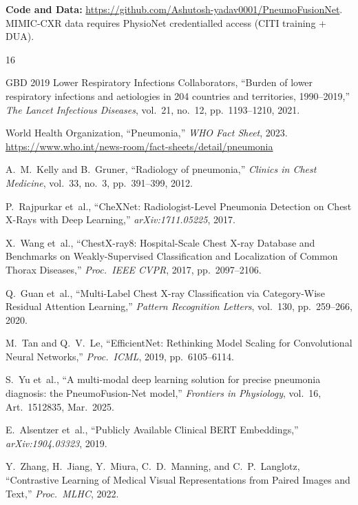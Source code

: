 \documentclass[conference]{IEEEtran}
\begin{document}
\vspace{4pt}
\noindent\textbf{Code and Data:} \url{https://github.com/Ashutosh-yadav0001/PneumoFusionNet}. MIMIC-CXR data requires PhysioNet credentialled access (CITI training + DUA).

{\small
\begin{thebibliography}{16}

GBD 2019 Lower Respiratory Infections Collaborators, ``Burden of lower respiratory infections and aetiologies in 204 countries and territories, 1990--2019,'' \emph{The Lancet Infectious Diseases}, vol.~21, no.~12, pp.~1193--1210, 2021.

World Health Organization, ``Pneumonia,'' \emph{WHO Fact Sheet}, 2023.
\url{https://www.who.int/news-room/fact-sheets/detail/pneumonia}

A.~M.~Kelly and B.~Gruner, ``Radiology of pneumonia,'' \emph{Clinics in Chest Medicine}, vol.~33, no.~3, pp.~391--399, 2012.

P.~Rajpurkar et~al., ``CheXNet: Radiologist-Level Pneumonia Detection on Chest X-Rays with Deep Learning,'' \emph{arXiv:1711.05225}, 2017.

X.~Wang et~al., ``ChestX-ray8: Hospital-Scale Chest X-ray Database and Benchmarks on Weakly-Supervised Classification and Localization of Common Thorax Diseases,'' \emph{Proc.\ IEEE CVPR}, 2017, pp.~2097--2106.

Q.~Guan et~al., ``Multi-Label Chest X-ray Classification via Category-Wise Residual Attention Learning,'' \emph{Pattern Recognition Letters}, vol.~130, pp.~259--266, 2020.

M.~Tan and Q.~V.~Le, ``EfficientNet: Rethinking Model Scaling for Convolutional Neural Networks,'' \emph{Proc.\ ICML}, 2019, pp.~6105--6114.

S.~Yu et~al., ``A multi-modal deep learning solution for precise pneumonia diagnosis: the PneumoFusion-Net model,'' \emph{Frontiers in Physiology}, vol.~16, Art.~1512835, Mar.\ 2025.

E.~Alsentzer et~al., ``Publicly Available Clinical BERT Embeddings,'' \emph{arXiv:1904.03323}, 2019.

Y.~Zhang, H.~Jiang, Y.~Miura, C.~D.~Manning, and C.~P.~Langlotz, ``Contrastive Learning of Medical Visual Representations from Paired Images and Text,'' \emph{Proc.\ MLHC}, 2022.


\end{thebibliography}}
\end{document}
